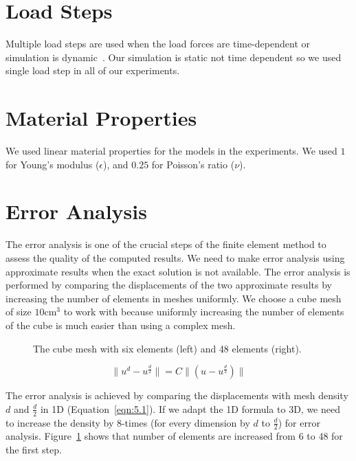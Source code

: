 \section{Load Steps}

Multiple load steps are used when the load forces are time-dependent or simulation is dynamic~\cite{Madenci06}. Our simulation is static not time dependent so we used single load step in all of our experiments.


\section{Material Properties}

We used linear material properties for the models in the experiments. We used $1$ for Young's modulus ($\epsilon$), and $0.25$ for Poisson's ratio ($\nu$).

\section{Error Analysis}

The error analysis is one of the crucial steps of the finite element method to assess the quality of the computed results. We need to make error analysis using approximate results when the exact solution is not available. The error analysis is performed by comparing the displacements of the two approximate results by increasing the number of elements in meshes uniformly. We choose a cube mesh of size $10$cm$^{3}$ to work with because uniformly increasing the number of elements of the cube is much easier than using a complex mesh.

\begin{figure}[htb]
\centerline{}
\caption{The cube mesh with six elements (left) and 48 elements (right).}
\label{fig:denser}
\end{figure}

\begin{equation}
\parallel u^d - u^{\frac{d}{2}}\parallel = C \parallel (u - u^{\frac{d}{2}}) \parallel
\label{eqn:5.1}
\end{equation}

The error analysis is achieved by comparing the displacements with mesh density $d$ and $\frac{d}{2}$ in 1D (Equation~\ref{eqn:5.1}). If we adapt the 1D formula to 3D, we need to increase the density by 8-times (for every dimension by $d$ to $\frac{d}{2}$) for error analysis. Figure~\ref{fig:denser} shows that number of elements are increased from 6 to 48 for the first step.

